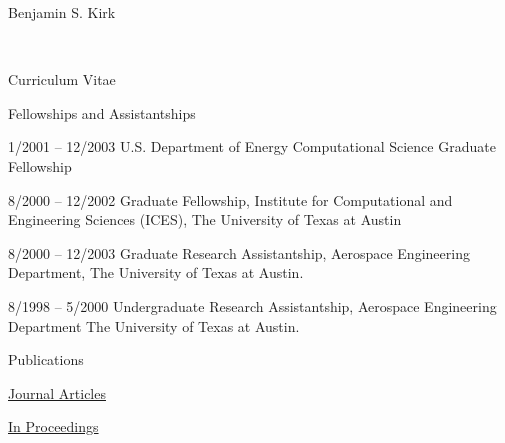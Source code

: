 \documentclass[11pt]{report}
\begin{document}
\begin{cv}{\centerline{Benjamin S. Kirk}\\
    \centerline{\small Curriculum Vitae}}
  \begin{cvlist}{Fellowships and Assistantships}
    \item[1/2001 -- 12/2003]
      U.S. Department of Energy Computational Science Graduate Fellowship
    \item[8/2000 -- 12/2002]
      Graduate Fellowship,
      Institute for Computational and Engineering Sciences (ICES),
      The University of Texas at Austin
    \item[8/2000 -- 12/2003]
      Graduate Research Assistantship,
      Aerospace Engineering Department,
      The University of Texas at Austin.
    \item[8/1998 -- 5/2000]
      Undergraduate Research Assistantship,
      Aerospace Engineering Department
      The University of Texas at Austin.
  \end{cvlist}
  
  
  \begin{cvlist}{Publications}

    \item[\underline{Journal Articles}]    

    \item[\underline{In Proceedings}]    


\end{cvlist}
\end{cv}
\end{document}
